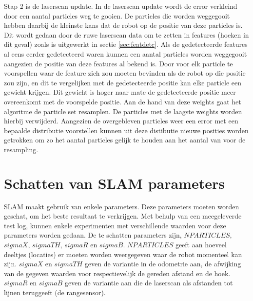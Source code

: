 \documentclass[a4paper]{article}
\begin{document}
Stap 2 is de laserscan update. In de laserscan update wordt de error verkleind door een aantal particles weg te gooien. De particles die worden weggegooit hebben daarbij de kleinste kans dat de robot op de positie van deze particles is. Dit wordt gedaan door de ruwe laserscan data om te zetten in features (hoeken in dit geval) zoals is uitgewerkt in sectie \ref{sec:featdetc}. Als de gedetecteerde features al eens eerder gedetecteerd waren kunnen een aantal particles worden weggegooit aangezien de positie van deze features al bekend is. Door voor elk particle te voorspellen waar de feature zich zou moeten bevinden als de robot op die positie zou zijn, en dit te vergelijken met de gedetecteerde positie kan elke particle een gewicht krijgen. Dit gewicht is hoger naar mate de gedetecteerde positie meer overeenkomt met de voorspelde positie. Aan de hand van deze weights gaat het algoritme de particle set resamplen. De particles met de laagste weights worden hierbij verwijderd. Aangezien de overgebleven particles weer een error met een bepaalde distributie voorstellen kunnen uit deze distibutie nieuwe posities worden getrokken om zo het aantal particles gelijk te houden aan het aantal van voor de resampling.

\section{Schatten van SLAM parameters}
SLAM maakt gebruik van enkele parameters. Deze parameters moeten worden geschat, om het beste resultaat te verkrijgen. Met behulp van een meegeleverde test log, kunnen enkele experimenten met verschillende waarden voor deze parameters worden gedaan. De te schatten parameters zijn, $NPARTICLES$, $sigmaX$, $sigmaTH$, $sigmaR$ en $sigmaB$. $NPARTICLES$ geeft aan hoeveel deeltjes (locaties) er moeten worden weergegeven waar de robot momenteel kan zijn. $sigmaX$ en $sigmaTH$ geven de variantie in de odometrie aan, de afwijking van de gegeven waarden voor respectievelijk de gereden afstand en de hoek. $sigmaR$ en $sigmaB$ geven de variantie aan die de laserscan als afstanden tot lijnen teruggeeft (de rangesensor).
\end{document}
